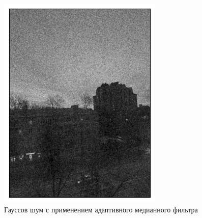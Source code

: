 \documentclass[a4paper,12pt]{article}
\begin{document}
\begin{figure}[H]
    \begin{minipage}{0.49\textwidth}
        \centering \includegraphics[width=\textwidth]{results/nlf_gaus_5.png}
        \caption{Гауссов шум с применением адаптивного медианного фильтра}
    \end{minipage}\hfill
    \begin{minipage}{0.49\textwidth}

\end{minipage}
\end{figure}
\end{document}
